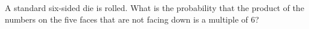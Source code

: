 A standard six-sided die is rolled. What is the probability that the product of the numbers on the five faces that are not facing down is a multiple of $6$?
